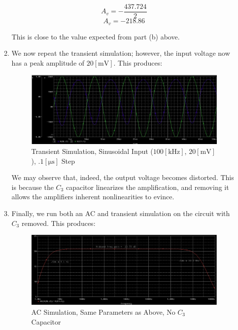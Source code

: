 \begin{enumerate}
\begin{enumerate}
        $$A_v=-\frac{437.724}{2}$$
        $$\boxed{A_v=-218.86}$$

        This is close to the value expected from part (b) above.

      \item We now repeat the transient simulation; however, the input voltage now has a peak amplitude of $20[\si{\milli\volt}]$. This produces:

        \begin{figure}[H]
          \centering
          \includegraphics[width=.9\textwidth]{Figures/HW7-3d}
          \caption{Transient Simulation, Sinusoidal Input ($100[\si{\kilo\hertz}]$, $20[\si{\milli\volt}]$), $.1[\si{\micro\second}]$ Step}
          \label{fig:11}
        \end{figure}

        We may observe that, indeed, the output voltage becomes distorted. This is because the $C_3$ capacitor linearizes the amplification, and removing it allows the amplifiers inherent nonlinearities to evince.

      \item Finally, we run both an AC and transient simulation on the circuit with $C_3$ removed. This produces:

        \begin{figure}[H]
          \centering
          \includegraphics[width=.9\textwidth]{Figures/HW7-3e1}
          \caption{AC Simulation, Same Parameters as Above, No $C_3$ Capacitor}
          \label{fig:12}
        \end{figure}


\end{enumerate}
\end{enumerate}
